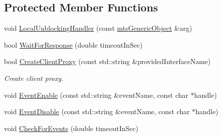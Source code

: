 \subsection*{Protected Member Functions}
\begin{DoxyCompactItemize}
\item 
void \hyperlink{classmts_socket_proxy_client_a8f39c906476855375c0e5f7ecdedc013}{Local\-Unblocking\-Handler} (const \hyperlink{classmts_generic_object}{mts\-Generic\-Object} \&arg)
\item 
bool \hyperlink{classmts_socket_proxy_client_af6b80c4a3ecf7d6f0cee93869df48ac8}{Wait\-For\-Response} (double timeout\-In\-Sec)
\item 
bool \hyperlink{classmts_socket_proxy_client_ac8874a9dfa82352906277e4ff8b05bdc}{Create\-Client\-Proxy} (const std\-::string \&provided\-Interface\-Name)
\begin{DoxyCompactList}\small\item\em Create client proxy. \end{DoxyCompactList}\item 
void \hyperlink{classmts_socket_proxy_client_a80af494a9712f53ccb04cd1e749c2e25}{Event\-Enable} (const std\-::string \&event\-Name, const char $\ast$handle)
\item 
void \hyperlink{classmts_socket_proxy_client_a295dd30cfb03e066ef9f2cd0e467355a}{Event\-Disable} (const std\-::string \&event\-Name, const char $\ast$handle)
\item 
void \hyperlink{classmts_socket_proxy_client_a27acfaf6fae696c609b6c6c9f1a744f4}{Check\-For\-Events} (double timeout\-In\-Sec)
\end{DoxyCompactItemize}
